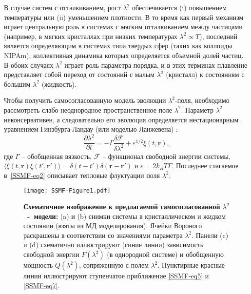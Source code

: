 В случае систем с отталкиванием, рост $\lambda^2$ обеспечивается (i) повышением температуры или (ii) уменьшением плотности.
В то время как первый механизм играет центральную роль в системах с мягким отталкиванием между частицами (например, в мягких кристаллах при низких температурах $\lambda^2\propto T $), последний является определяющим в системах типа твердых сфер (таких как коллоиды NIPAm), коллективная динамика которых определяется объемной долей частиц.
В обоих случаях $\lambda^2$ играет роль параметра порядка, и в этих терминах плавление представляет собой переход от состояний с малым $\lambda^2$ (кристалл) к состояниям с большим $\lambda^2$ (жидкость).

Чтобы получить самосогласованную модель эволюции $ \lambda^2$-поля,
необходимо рассмотреть слабо неоднородное пространственное поле $\lambda^2$.
Параметр $\lambda ^ 2$ неконсервативен, а следовательно его эволюция определяется нестационарным уравнением Гинзбурга-Ландау (или моделью Ланжевена) \cite{book.desai}:
\begin{equation}
\label{SSMF-eq4}
\frac{\partial \lambda^2}{\partial t} = -\Gamma \frac{\delta \mathcal{F}}{\delta \lambda^2} + \varepsilon^{1/2}\xi(t,\mathbf{r}),
\end{equation}
где $\Gamma$ -- обобщенная вязкость, $ \mathcal{F} $ -- функционал свободной энергии системы, $\langle \xi(t,\mathbf{r})\xi(t',\mathbf{r}')\rangle = \delta(t-t')\delta(\mathbf{r}-\mathbf{r}')$ и $\varepsilon = 2k_BT\Gamma$.
Последнее слагаемое в~\eqref{SSMF-eq2} описывает тепловые флуктуации поля $\lambda^2$.

\begin{figure}[!t]
\centering
 \texttt{[image: SSMF-Figure1.pdf]}
 \caption{\textbf{Схематичное изображение к предлагаемой самосогласованной $\lambda^2$~-~модели:}
 (a) и (b) снимки системы в кристаллическом и жидком состоянии (взяты из МД моделирования).
  Ячейки Вороного раскрашены в соответствии со значениями параметра $ \lambda^2$.
  Панели (c) и (d) схематично иллюстрируют (синие линии) зависимость свободной энергии $ F (\lambda ^ 2) $ (в однородной системе) и обобщенную мощность $ Q (\lambda ^ 2) $, сопряженную с полем $\lambda^2$.
 Пунктирные красные линии иллюстрируют ступенчатое приближение \eqref{SSMF-eq5} и \eqref{SSMF-eq7}.
 }
\label{SSMF-Figure1}
\end{figure}



